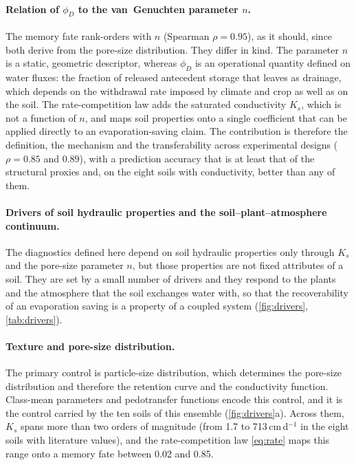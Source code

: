 \paragraph{Relation of $\phi_D$ to the van~Genuchten parameter $n$.} The memory fate rank-orders with $n$ (Spearman $\rho=0.95$), as it should, since both derive from the pore-size distribution. They differ in kind. The parameter $n$ is a static, geometric descriptor, whereas $\phi_D$ is an operational quantity defined on water fluxes: the fraction of released antecedent storage that leaves as drainage, which depends on the withdrawal rate imposed by climate and crop as well as on the soil. The rate-competition law adds the saturated conductivity $K_s$, which is not a function of $n$, and maps soil properties onto a single coefficient that can be applied directly to an evaporation-saving claim. The contribution is therefore the definition, the mechanism and the transferability across experimental designs ($\rho=0.85$ and 0.89), with a prediction accuracy that is at least that of the structural proxies and, on the eight soils with conductivity, better than any of them.

\paragraph{Drivers of soil hydraulic properties and the soil--plant--atmosphere continuum.}
\label{sec:drivers}
The diagnostics defined here depend on soil hydraulic properties only through $K_s$ and the pore-size parameter $n$, but those properties are not fixed attributes of a soil. They are set by a small number of drivers and they respond to the plants and the atmosphere that the soil exchanges water with, so that the recoverability of an evaporation saving is a property of a coupled system (\cref{fig:drivers}, \cref{tab:drivers}).

\paragraph{Texture and pore-size distribution.} The primary control is particle-size distribution, which determines the pore-size distribution and therefore the retention curve and the conductivity function. Class-mean parameters and pedotransfer functions \citep{Carsel1988,Schaap2001,Saxton2006,Weber2024} encode this control, and it is the control carried by the ten soils of this ensemble (\cref{fig:drivers}a). Across them, $K_s$ spans more than two orders of magnitude (from 1.7 to 713\,cm\,d$^{-1}$ in the eight soils with literature values), and the rate-competition law \cref{eq:rate} maps this range onto a memory fate between 0.02 and 0.85.

